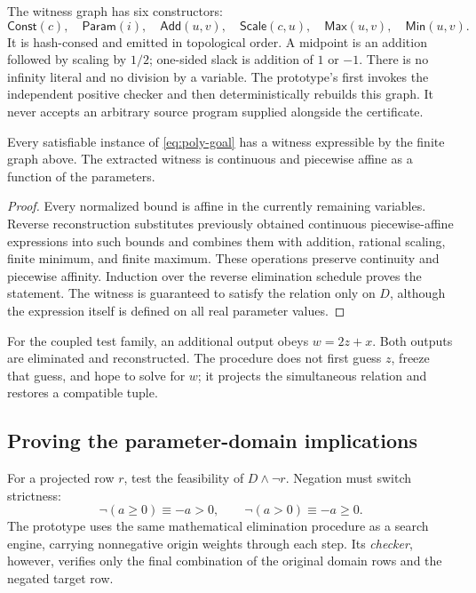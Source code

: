 The witness graph has six constructors:
\[
 \mathsf{Const}(c),\quad\mathsf{Param}(i),\quad
 \mathsf{Add}(u,v),\quad\mathsf{Scale}(c,u),\quad
 \mathsf{Max}(u,v),\quad\mathsf{Min}(u,v).
\]
It is hash-consed and emitted in topological order. A midpoint is an addition followed by scaling by \(1/2\); one-sided slack is addition of \(1\) or \(-1\). There is no infinity literal and no division by a variable. The prototype's  first invokes the independent positive checker and then deterministically rebuilds this graph. It never accepts an arbitrary source program supplied alongside the certificate.

\begin{corollary}\label{cor:piecewise}
Every satisfiable instance of \eqref{eq:poly-goal} has a witness expressible by the finite graph above. The extracted witness is continuous and piecewise affine as a function of the parameters.
\end{corollary}
\begin{proof}
Every normalized bound is affine in the currently remaining variables. Reverse reconstruction substitutes previously obtained continuous piecewise-affine expressions into such bounds and combines them with addition, rational scaling, finite minimum, and finite maximum. These operations preserve continuity and piecewise affinity. Induction over the reverse elimination schedule proves the statement. The witness is guaranteed to satisfy the relation only on \(D\), although the expression itself is defined on all real parameter values.
\end{proof}

For the coupled test family, an additional output obeys \(w=2z+x\). Both outputs are eliminated and reconstructed. The procedure does not first guess \(z\), freeze that guess, and hope to solve for \(w\); it projects the simultaneous relation and restores a compatible tuple.

\subsection{Proving the parameter-domain implications}
For a projected row \(r\), test the feasibility of \(D\land\neg r\). Negation must switch strictness:
\[
 \neg(a\ge0)\equiv -a>0,
 \qquad
 \neg(a>0)\equiv -a\ge0.
\]
The prototype uses the same mathematical elimination procedure as a search engine, carrying nonnegative origin weights through each step. Its \emph{checker}, however, verifies only the final combination of the original domain rows and the negated target row.

